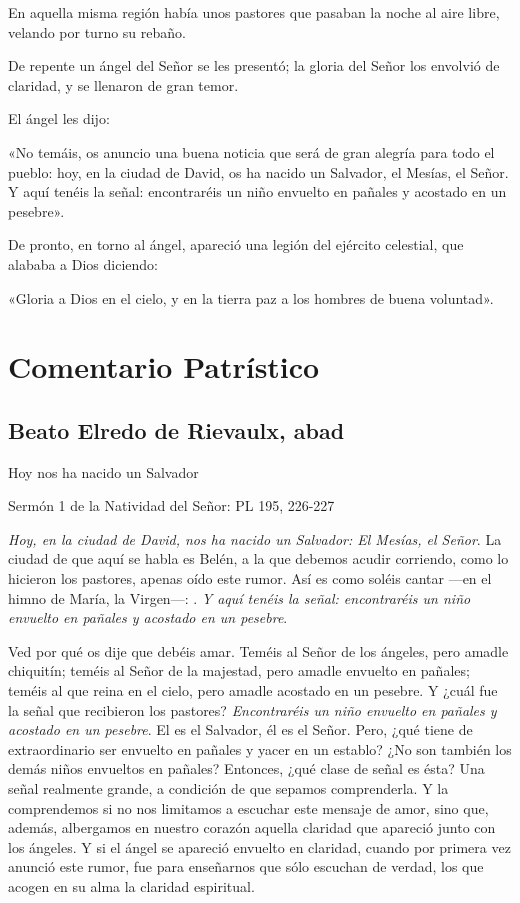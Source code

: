 \begin{body}
\begin{body}
En aquella misma región había unos pastores que pasaban la noche al aire
libre, velando por turno su rebaño.

De repente un ángel del Señor se les presentó; la gloria del Señor los
envolvió de claridad, y se llenaron de gran temor.

El ángel les dijo:

«No temáis, os anuncio una buena noticia que será de gran alegría para
todo el pueblo: hoy, en la ciudad de David, os ha nacido un Salvador, el
Mesías, el Señor. Y aquí tenéis la señal: encontraréis un niño envuelto
en pañales y acostado en un pesebre».

De pronto, en torno al ángel, apareció una legión del ejército
celestial, que alababa a Dios diciendo:

«Gloria a Dios en el cielo, y en la tierra paz a los hombres de buena
voluntad».



\section{Comentario Patrístico}

\subsection{Beato Elredo de Rievaulx, abad}

Hoy nos ha nacido un Salvador

Sermón 1 de la Natividad del Señor: PL 195, 226-227

\emph{Hoy, en la ciudad de David, nos ha nacido un Salvador: El Mesías, el Señor}. La ciudad de que aquí se habla es Belén, a la que debemos acudir corriendo, como lo hicieron los pastores, apenas oído este rumor. Así es como soléis cantar ---en el himno de María, la Virgen---: . \emph{Y aquí tenéis la señal: encontraréis un niño envuelto en pañales y acostado en un pesebre}.

Ved por qué os dije que debéis amar. Teméis al Señor de los ángeles, pero amadle chiquitín; teméis al Señor de la majestad, pero amadle envuelto en pañales; teméis al que reina en el cielo, pero amadle acostado en un pesebre. Y ¿cuál fue la señal que recibieron los pastores? \emph{Encontraréis un niño envuelto en pañales y acostado en un pesebre}. El es el Salvador, él es el Señor. Pero, ¿qué tiene de extraordinario ser envuelto en pañales y yacer en un establo? ¿No son también los demás niños envueltos en pañales? Entonces, ¿qué clase de señal es ésta? Una señal realmente grande, a condición de que sepamos comprenderla. Y la comprendemos si no nos limitamos a escuchar este mensaje de amor, sino que, además, albergamos en nuestro corazón aquella claridad que apareció junto con los ángeles. Y si el ángel se apareció envuelto en claridad, cuando por primera vez anunció este rumor, fue para enseñarnos que sólo escuchan de verdad, los que acogen en su alma la claridad espiritual.


\end{body}
\end{body}
